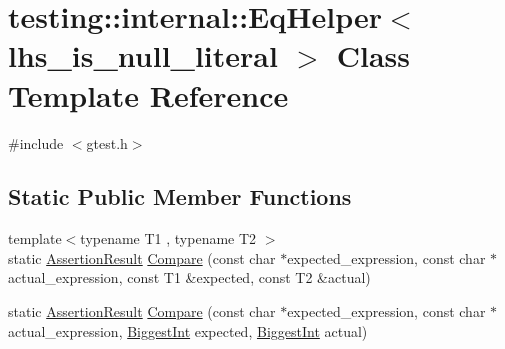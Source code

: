 \hypertarget{classtesting_1_1internal_1_1_eq_helper}{\section{testing\+:\+:internal\+:\+:Eq\+Helper$<$ lhs\+\_\+is\+\_\+null\+\_\+literal $>$ Class Template Reference}
\label{classtesting_1_1internal_1_1_eq_helper}
}


{\ttfamily \#include $<$gtest.\+h$>$}

\subsection*{Static Public Member Functions}
\begin{DoxyCompactItemize}
\item 
{\footnotesize template$<$typename T1 , typename T2 $>$ }\\static \hyperlink{classtesting_1_1_assertion_result}{Assertion\+Result} \hyperlink{classtesting_1_1internal_1_1_eq_helper_ac2977ed90cd3c88607f804e43b86b92c}{Compare} (const char $\ast$expected\+\_\+expression, const char $\ast$actual\+\_\+expression, const T1 \&expected, const T2 \&actual)
\item 
static \hyperlink{classtesting_1_1_assertion_result}{Assertion\+Result} \hyperlink{classtesting_1_1internal_1_1_eq_helper_a3de996954b41d484c065ed824fe7eac9}{Compare} (const char $\ast$expected\+\_\+expression, const char $\ast$actual\+\_\+expression, \hyperlink{namespacetesting_1_1internal_a05c6bd9ede5ccdf25191a590d610dcc6}{Biggest\+Int} expected, \hyperlink{namespacetesting_1_1internal_a05c6bd9ede5ccdf25191a590d610dcc6}{Biggest\+Int} actual)
\end{DoxyCompactItemize}


